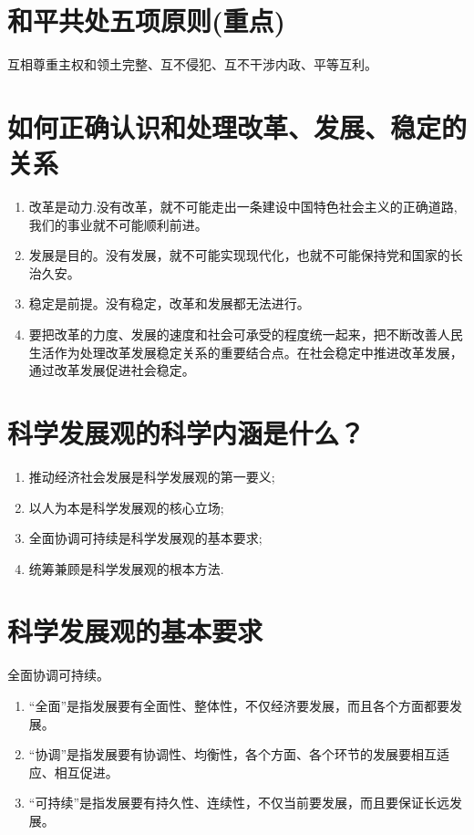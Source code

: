 \documentclass[12pt, a4paper, oneside]{ctexbook}
\begin{document}
\section{和平共处五项原则(重点)}

互相尊重主权和领土完整、互不侵犯、互不干涉内政、平等互利。

\section{如何正确认识和处理改革、发展、稳定的关系}

\begin{enumerate}
\item 改革是动力.没有改革，就不可能走出一条建设中国特色社会主义的正确道路,我们的事业就不可能顺利前进。

\item 发展是目的。没有发展，就不可能实现现代化，也就不可能保持党和国家的长治久安。

\item 稳定是前提。没有稳定，改革和发展都无法进行。

\item 要把改革的力度、发展的速度和社会可承受的程度统一起来，把不断改善人民生活作为处理改革发展稳定关系的重要结合点。在社会稳定中推进改革发展，通过改革发展促进社会稳定。
\end{enumerate}

\section{科学发展观的科学内涵是什么？}
\begin{enumerate}
\item 推动经济社会发展是科学发展观的第一要义;
\item 以人为本是科学发展观的核心立场;
\item 全面协调可持续是科学发展观的基本要求;
\item 统筹兼顾是科学发展观的根本方法.
\end{enumerate}

\section{科学发展观的基本要求}

全面协调可持续。
\begin{enumerate}
\item “全面”是指发展要有全面性、整体性，不仅经济要发展，而且各个方面都要发展。

\item “协调”是指发展要有协调性、均衡性，各个方面、各个环节的发展要相互适应、相互促进。

\item “可持续”是指发展要有持久性、连续性，不仅当前要发展，而且要保证长远发展。
\end{enumerate}
\end{document}

